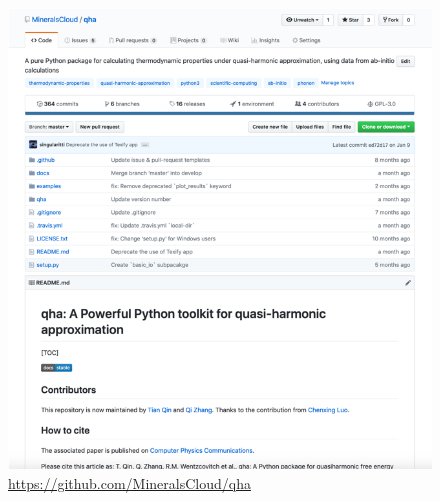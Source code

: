 \documentclass[13pt,aspectratio=169]{beamer}
\begin{document}
\begin{frame}{\subsecname}
	\begin{columns}
		\begin{column}{0.45\textwidth}
			\begin{figure}
				\includegraphics[height=0.7\textheight]{images/website}%
				\captionsetup{labelformat=empty}
				\caption{\scriptsize\url{https://github.com/MineralsCloud/qha}}
			\end{figure}
		\end{column}


\end{columns}
\end{frame}
\end{document}
